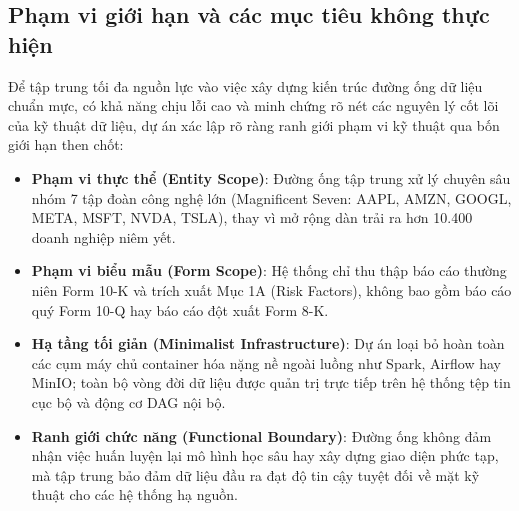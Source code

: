 \subsection{Phạm vi giới hạn và các mục tiêu không thực hiện}
Để tập trung tối đa nguồn lực vào việc xây dựng kiến trúc đường ống dữ liệu chuẩn mực, có khả năng chịu lỗi cao và minh chứng rõ nét các nguyên lý cốt lõi của kỹ thuật dữ liệu, dự án xác lập rõ ràng ranh giới phạm vi kỹ thuật qua bốn giới hạn then chốt:
\begin{itemize}
    \item \textbf{Phạm vi thực thể (Entity Scope)}: Đường ống tập trung xử lý chuyên sâu nhóm 7 tập đoàn công nghệ lớn (Magnificent Seven: AAPL, AMZN, GOOGL, META, MSFT, NVDA, TSLA), thay vì mở rộng dàn trải ra hơn 10.400 doanh nghiệp niêm yết.
    \item \textbf{Phạm vi biểu mẫu (Form Scope)}: Hệ thống chỉ thu thập báo cáo thường niên Form 10-K và trích xuất Mục 1A (Risk Factors), không bao gồm báo cáo quý Form 10-Q hay báo cáo đột xuất Form 8-K.
    \item \textbf{Hạ tầng tối giản (Minimalist Infrastructure)}: Dự án loại bỏ hoàn toàn các cụm máy chủ container hóa nặng nề ngoài luồng như Spark, Airflow hay MinIO; toàn bộ vòng đời dữ liệu được quản trị trực tiếp trên hệ thống tệp tin cục bộ và động cơ DAG nội bộ.
    \item \textbf{Ranh giới chức năng (Functional Boundary)}: Đường ống không đảm nhận việc huấn luyện lại mô hình học sâu hay xây dựng giao diện phức tạp, mà tập trung bảo đảm dữ liệu đầu ra đạt độ tin cậy tuyệt đối về mặt kỹ thuật cho các hệ thống hạ nguồn.
\end{itemize}
